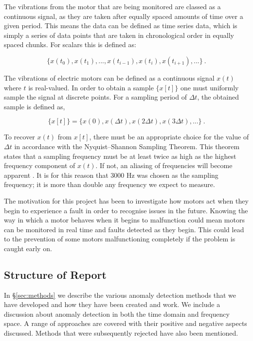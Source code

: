 The vibrations from the motor that are being monitored are classed as a continuous signal, as they are taken after equally spaced amounts of time over a given period. This means the data can be defined as time series data, which is simply a series of data points that are taken in chronological order in equally spaced chunks. For scalars this is defined as:

\begin{equation}
    \{x(t_0), x(t_1), ..., x(t_{i-1}), x(t_i), x(t_{i+1}), ...\}~.
\end{equation}

The vibrations of electric motors can be defined as a continuous signal $x(t)$ where $t$ is real-valued. In order to obtain a sample $\{x[t]\}$ one must uniformly sample the signal at discrete points. For a sampling period of $\Delta t$, the obtained sample is defined as,

\begin{equation}
    \{x[t]\} = \{x(0), x(\Delta t), x(2\Delta t), x(3\Delta t),...\}~.
\end{equation}

To recover $x(t)$ from $x[t]$, there must be an appropriate choice for the value of $\Delta t$ in accordance with the Nyquist–Shannon Sampling Theorem. This theorem states that a sampling frequency must be at least twice as high as the highest frequency component of $x(t)$. If not, an aliasing of frequencies will become apparent \cite{Ficker2015}. It is for this reason that 3000 Hz was chosen as the sampling frequency; it is more than double any frequency we expect to measure.

The motivation for this project has been to investigate how motors act when they begin to experience a fault in order to recognise issues in the future. Knowing the way in which a motor behaves when it begins to malfunction could mean motors can be monitored in real time and faults detected as they begin. This could lead to the prevention of some motors malfunctioning completely if the problem is caught early on.

\clearpage
\subsection{Structure of Report}

In \S\ref{sec:methods} we describe the various anomaly detection methods that we have developed and how they have been created and work. We include a discussion about anomaly detection in both the time domain and frequency space. A range of approaches are covered with their positive and negative aspects discussed. Methods that were subsequently rejected have also been mentioned.

